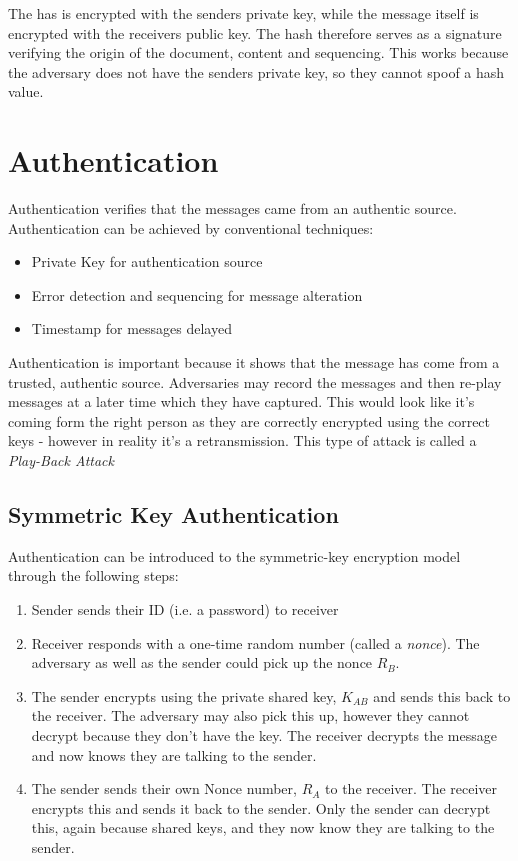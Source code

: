 The has is encrypted with the senders private key, while the message itself is encrypted with the receivers public key. The hash therefore serves as a signature verifying the origin of the document, content and sequencing. This works because the adversary does not have the senders private key, so they cannot spoof a hash value. 

\section{Authentication}
Authentication verifies that the messages came from an authentic source. Authentication can be achieved by conventional techniques:
\begin{itemize}
    \item Private Key for authentication source
    \item Error detection and sequencing for message alteration 
    \item Timestamp for messages delayed 
\end{itemize}

Authentication is important because it shows that the message has come from a trusted, authentic source. Adversaries may record the messages and then re-play messages at a later time which they have captured. This would look like it's coming form the right person as they are correctly encrypted using the correct keys - however in reality it's a retransmission. This type of attack is called a \textit{Play-Back Attack}

\subsection{Symmetric Key Authentication}
Authentication can be introduced to the symmetric-key encryption model through the following steps:
\begin{enumerate}
    \item Sender sends their ID (i.e. a password) to receiver
    \item Receiver responds with a one-time random number (called a \textit{nonce}). The adversary as well as the sender could pick up the nonce $R_B$. 
    \item The sender encrypts using the private shared key, $K_{AB}$ and sends this back to the receiver. The adversary may also pick this up, however they cannot decrypt because they don't have the key. The receiver decrypts the message and now knows they are talking to the sender.
    \item The sender sends their own Nonce number, $R_A$ to the receiver. The receiver encrypts this and sends it back to the sender. Only the sender can decrypt this, again because shared keys, and they now know they are talking to the sender. 
\end{enumerate}

